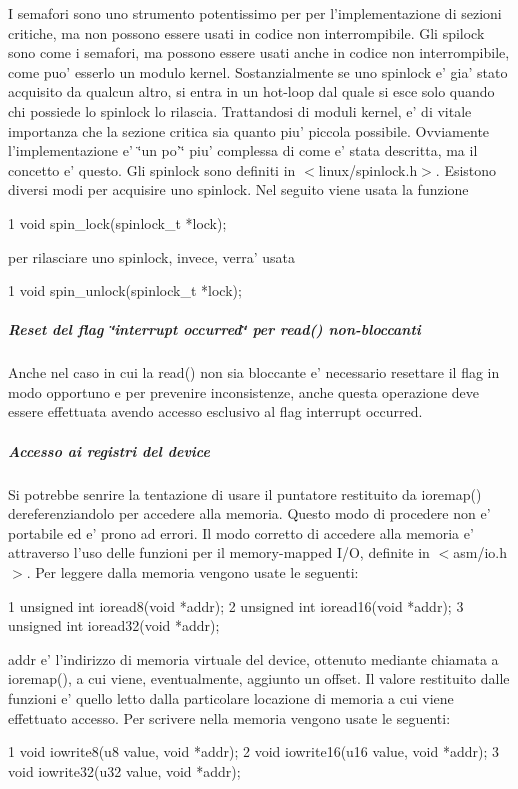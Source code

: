 I semafori sono uno strumento potentissimo per per l'implementazione di sezioni critiche, ma non possono essere usati in codice non interrompibile. Gli spilock sono come i semafori, ma possono essere usati anche in codice non interrompibile, come puo' esserlo un modulo kernel. Sostanzialmente se uno spinlock e' gia' stato acquisito da qualcun altro, si entra in un hot-\/loop dal quale si esce solo quando chi possiede lo spinlock lo rilascia. Trattandosi di moduli kernel, e' di vitale importanza che la sezione critica sia quanto piu' piccola possibile. Ovviamente l'implementazione e' \char`\"{}un po'\char`\"{} piu' complessa di come e' stata descritta, ma il concetto e' questo. Gli spinlock sono definiti in $<$linux/spinlock.\+h$>$. Esistono diversi modi per acquisire uno spinlock. Nel seguito viene usata la funzione 
\begin{DoxyCode}
1 void spin\_lock(spinlock\_t *lock);
\end{DoxyCode}
 per rilasciare uno spinlock, invece, verra' usata 
\begin{DoxyCode}
1 void spin\_unlock(spinlock\_t *lock);
\end{DoxyCode}


\subparagraph*{Reset del flag \char`\"{}interrupt occurred\char`\"{} per read() non-\/bloccanti}

Anche nel caso in cui la read() non sia bloccante e' necessario resettare il flag in modo opportuno e per prevenire inconsistenze, anche questa operazione deve essere effettuata avendo accesso esclusivo al flag interrupt occurred.

\subparagraph*{Accesso ai registri del device}

Si potrebbe senrire la tentazione di usare il puntatore restituito da ioremap() dereferenziandolo per accedere alla memoria. Questo modo di procedere non e' portabile ed e' prono ad errori. Il modo corretto di accedere alla memoria e' attraverso l'uso delle funzioni per il memory-\/mapped I/\+O, definite in $<$asm/io.\+h$>$. Per leggere dalla memoria vengono usate le seguenti\+: 
\begin{DoxyCode}
1 unsigned int ioread8(void *addr);
2 unsigned int ioread16(void *addr);
3 unsigned int ioread32(void *addr);
\end{DoxyCode}
 addr e' l'indirizzo di memoria virtuale del device, ottenuto mediante chiamata a ioremap(), a cui viene, eventualmente, aggiunto un offset. Il valore restituito dalle funzioni e' quello letto dalla particolare locazione di memoria a cui viene effettuato accesso. Per scrivere nella memoria vengono usate le seguenti\+: 
\begin{DoxyCode}
1 void iowrite8(u8 value, void *addr);
2 void iowrite16(u16 value, void *addr);
3 void iowrite32(u32 value, void *addr);
\end{DoxyCode}


